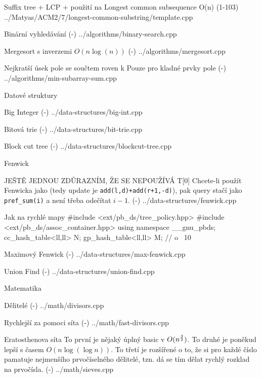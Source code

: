 \secc Suffix tree + LCP + použití na Longest common subsequence
O(n)
\verbinput (1-103) ../Matyas/ACM2/7/longest-common-substring/template.cpp

\sec Binární vyhledávání
\verbinput (-) ../algorithms/binary-search.cpp

\sec Mergesort s inverzemi
$O(n\log(n))$
\verbinput (-) ../algorithms/mergesort.cpp

\sec Nejkratší úsek pole se součtem roven k
Pouze pro kladné prvky pole
\verbinput (-) ../algorithms/min-subarray-sum.cpp

\newpage

\chap Datové struktury

\sec Big Integer
\verbinput (-) ../data-structures/big-int.cpp

\sec Bitová trie
\verbinput (-) ../data-structures/bit-trie.cpp

\sec Block cut tree
\verbinput (-) ../data-structures/blockcut-tree.cpp

\sec Fenwick

JEŠTĚ JEDNOU ZDŮRAZNÍM, ŽE SE NEPOUŽÍVÁ T[0]\linebreak
Chcete-li použít Fenwicka jako  (tedy update je {\tt add(l,d)+add(r+1,-d)}), pak query stačí jako {\tt pref\_sum(i)} a není třeba odečítat $i-1$.
\verbinput (-) ../data-structures/fenwick.cpp

\sec Jak na rychlé mapy
\begtt
#include <ext/pb_ds/tree_policy.hpp>
#include <ext/pb_ds/assoc_container.hpp>
using namespace __gnu_pbds;
cc_hash_table<ll,ll> N;
gp_hash_table<ll,ll> M; // o ~10%
\endtt

\sec Maximový Fenwick
\verbinput (-) ../data-structures/max-fenwick.cpp

\sec Union Find
\verbinput (-) ../data-structures/union-find.cpp

\newpage

\chap Matematika

\sec Dělitelé
\verbinput (-) ../math/divisors.cpp

\secc Rychlejší za pomoci síta
\verbinput (-) ../math/fast-divisors.cpp

\sec Eratosthenova síta
To první je nějaký úplný basic v $O(n^{3 \over 2})$. To druhé je poněkud lepší s časem $O(n\log(\log n))$. To třetí je rozšířené o to, že si pro každé číslo pamatuje nejmenšího prvočíselného dělitelé, tzn. dá se tím dělat rychlý rozklad na prvočísla.
\verbinput (-) ../math/sieves.cpp

